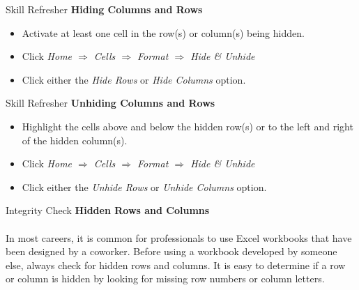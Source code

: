 \begin{center}
	\begin{sklbox}{Skill Refresher}
		\textbf{Hiding Columns and Rows}
		\\
		\begin{itemize}
			\setlength{\itemsep}{0pt}
			\setlength{\parskip}{0pt}
			\setlength{\parsep}{0pt}
			
			\item Activate at least one cell in the row(s) or column(s) being hidden.
			\item Click \textit{Home $ \Rightarrow $ Cells $ \Rightarrow $ Format $ \Rightarrow $ Hide \& Unhide}
			\item Click either the \textit{Hide Rows} or \textit{Hide Columns} option.
			
		\end{itemize}
	\end{sklbox}
\end{center}


\begin{center}
	\begin{sklbox}{Skill Refresher}
		\textbf{Unhiding Columns and Rows}
		\\
		\begin{itemize}
			\setlength{\itemsep}{0pt}
			\setlength{\parskip}{0pt}
			\setlength{\parsep}{0pt}
			
			\item Highlight the cells above and below the hidden row(s) or to the left and right of the hidden column(s).
			\item Click \textit{Home $ \Rightarrow $ Cells $ \Rightarrow $ Format $ \Rightarrow $ Hide \& Unhide}
			\item Click either the \textit{Unhide Rows} or \textit{Unhide Columns} option.
			
		\end{itemize}
	\end{sklbox}
\end{center}

\begin{center}
	\begin{infobox}{Integrity Check}
		\textbf{Hidden Rows and Columns}
		\\
		\\
		In most careers, it is common for professionals to use Excel workbooks that have been designed by a coworker. Before using a workbook developed by someone else, always check for hidden rows and columns. It is easy to determine if a row or column is hidden by looking for missing row  numbers or column letters.
	\end{infobox}
\end{center}

